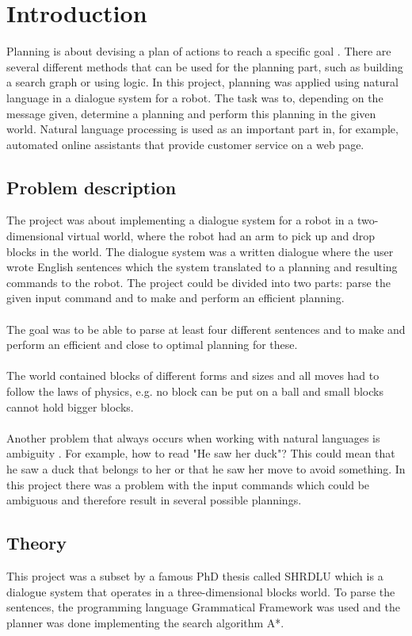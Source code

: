 \chapter{Introduction}
Planning is about devising a plan of actions to reach a specific goal
\citep{planning_ai}. There are several different methods that can be used for
the planning part, such as building a search graph or using logic. In this
project, planning was applied using natural language in a dialogue system for a
robot. The task was to, depending on the message given, determine a planning
and perform this planning in the given world. Natural language processing is
used as an important part in, for example, automated online assistants that
provide customer service on a web page. 

\section{Problem description}
The project was about implementing a dialogue system for a robot in a
two-dimensional virtual world, where the robot had an arm to pick up and drop
blocks in the world. The dialogue system was a written dialogue where the user
wrote English sentences which the system translated to a planning and resulting
commands to the robot. The project could be divided into two parts: parse the
given input command and to make and perform an efficient planning. \\\\
The goal was to be able to parse at least four different sentences and to make
and perform an efficient and close to optimal planning for these. 
\\\\
The world contained blocks of different forms and sizes and all moves had to
follow the laws of physics, e.g. no block can be put on a ball and small blocks
cannot hold bigger blocks. \\\\ Another problem that always occurs when working
with natural languages is ambiguity \citep{naturallang_ai}. For example, how to
read "He saw her duck"? This could mean that he saw a duck that belongs to her
or that he saw her move to avoid something. In this project there was a problem
with the input commands which could be ambiguous and therefore result in
several possible plannings. 

\section{Theory}
This project was a subset by a famous PhD thesis called SHRDLU which  is a
dialogue system that operates in a three-dimensional blocks world. To parse the
sentences, the programming language Grammatical Framework was used and the
planner was done implementing the search algorithm A*.

